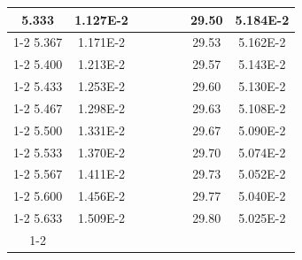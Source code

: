 \documentclass[article,12pt]{elsarticle}
\begin{document}
\begin{longtable}[c]{|c|c|cccccc}
5.333    & 1.127E-2  &                       &                              &                            & \multicolumn{1}{c|}{} & \multicolumn{1}{c|}{29.50}   & \multicolumn{1}{c|}{5.184E-2} \\ \cline{1-2} \cline{7-8} 
5.367    & 1.171E-2  &                       &                              &                            & \multicolumn{1}{c|}{} & \multicolumn{1}{c|}{29.53}   & \multicolumn{1}{c|}{5.162E-2} \\ \cline{1-2} \cline{7-8} 
5.400    & 1.213E-2  &                       &                              &                            & \multicolumn{1}{c|}{} & \multicolumn{1}{c|}{29.57}   & \multicolumn{1}{c|}{5.143E-2} \\ \cline{1-2} \cline{7-8} 
5.433    & 1.253E-2  &                       &                              &                            & \multicolumn{1}{c|}{} & \multicolumn{1}{c|}{29.60}   & \multicolumn{1}{c|}{5.130E-2} \\ \cline{1-2} \cline{7-8} 
5.467    & 1.298E-2  &                       &                              &                            & \multicolumn{1}{c|}{} & \multicolumn{1}{c|}{29.63}   & \multicolumn{1}{c|}{5.108E-2} \\ \cline{1-2} \cline{7-8} 
5.500    & 1.331E-2  &                       &                              &                            & \multicolumn{1}{c|}{} & \multicolumn{1}{c|}{29.67}   & \multicolumn{1}{c|}{5.090E-2} \\ \cline{1-2} \cline{7-8} 
5.533    & 1.370E-2  &                       &                              &                            & \multicolumn{1}{c|}{} & \multicolumn{1}{c|}{29.70}   & \multicolumn{1}{c|}{5.074E-2} \\ \cline{1-2} \cline{7-8} 
5.567    & 1.411E-2  &                       &                              &                            & \multicolumn{1}{c|}{} & \multicolumn{1}{c|}{29.73}   & \multicolumn{1}{c|}{5.052E-2} \\ \cline{1-2} \cline{7-8} 
5.600    & 1.456E-2  &                       &                              &                            & \multicolumn{1}{c|}{} & \multicolumn{1}{c|}{29.77}   & \multicolumn{1}{c|}{5.040E-2} \\ \cline{1-2} \cline{7-8} 
5.633    & 1.509E-2  &                       &                              &                            & \multicolumn{1}{c|}{} & \multicolumn{1}{c|}{29.80}   & \multicolumn{1}{c|}{5.025E-2} \\ \cline{1-2} \cline{7-8} 

\end{longtable}
\end{document}

